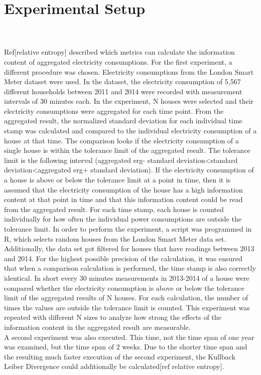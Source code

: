 \section{Experimental Setup}
\\
\\
Ref[relative entropy] described which metrics can calculate the information content of aggregated electricity consumptions. For the first experiment, a different procedure was chosen. Electricity consumptions from the London Smart Meter dataset were used. In the dataset, the electricity consumption of 5,567 different households between 2011 and 2014 were recorded with measurement intervals of 30 minutes each. In the experiment, N houses were selected and their electricity consumptions were aggregated for each time point. From the aggregated result, the normalized standard deviation for each individual time stamp was calculated and compared to the individual electricity consumption of a house at that time. The comparison looks if the electricity consumption of a single house is within the tolerance limit of the aggregated result. The tolerance limit is the following interval (aggregated erg- standard deviation<standard deviation<aggregated erg+ standard deviation). If the electricity consumption of a house is above or below the tolerance limit at a point in time, then it is assumed that the electricity consumption of the house has a high information content at that point in time and that this information content could be read from the aggregated result. For each time stamp, each house is counted individually for how often the individual power consumptions are outside the tolerance limit. In order to perform the experiment, a script was programmed in R, which selects random houses from the London Smart Meter data set. Additionally, the data set got filtered for houses that have readings between 2013 and 2014. For the highest possible precision of the calculation, it was ensured that when a comparison calculation is performed, the time stamp is also correctly identical. In short every 30 minutes measurements in 2013-2014 of a house were compared whether the electricity consumption is above or below the tolerance limit of the aggregated results of N houses. For each calculation, the number of times the values are outside the tolerance limit is counted. This experiment was repeated with different N sizes to analyze how strong the effects of the information content in the aggregated result are measurable.\\
A second experiment was also executed. This time, not the time span of one year was examined, but the time span of 2 weeks. Due to the shorter time span and the resulting much faster execution of the second experiment, the Kullback Leiber Divergence could additionally be calculated[ref relative entropy]. 
